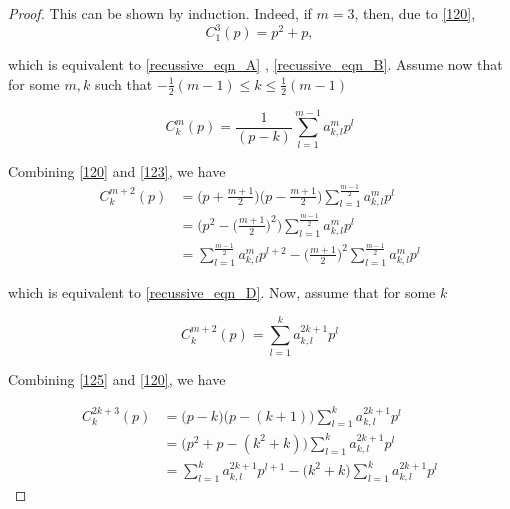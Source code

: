 \documentclass[../document.tex]{subfiles}
\begin{document}
\begin{appendices}
\begin{proof}
			This can be shown by induction. Indeed, if
			$m = 3$, then, due to \eqref{120},
			\begin{equation} \label{122}
				C_1^3(p) = p^2 +p,
			\end{equation}
			
			which is equivalent to \eqref{recussive_eqn_A} , \eqref{recussive_eqn_B}. Assume now that for some $m,k$ such that $	-\frac{1}{2}(m-1) \leq k \leq \frac{1}{2}(m-1) $
			
			
			\begin{equation}  \label{123}
				C_k^m(p) = \frac{1}{(p-k)} \sum_{l=1 }^{m-1} a_{k,l}^{m}p^l
			\end{equation}
			
			Combining \eqref{120} and \eqref{123}, we have
			\begin{equation} \label{124}
				\begin{split}
					C_k^{m+2}(p) &= \Big(p +\frac{m+1}{2}\Big) \Big(p -\frac{m+1}{2}\Big) 
					\sum_{l=1}^{\frac{m-1}{2}} a_{k,l}^{m}p^l
					\\
					&= \Bigg(p^2 -\Big( \frac{m+1}{2}\Big)^2\Bigg) 
					\sum_{l=1}^{\frac{m-1}{2}} a_{k,l}^{m}p^l
					\\
					&= \sum_{l=1}^{\frac{m-1}{2}} a_{k,l}^{m} p^{l+2}  - \Big( \frac{m+1}{2}\Big)^2 
					\sum_{l=1}^{\frac{m-1}{2}} a_{k,l}^{m} p^{l}
				\end{split}
			\end{equation}
			
			which is equivalent to \eqref{recussive_eqn_D}. Now, assume that for some $k$
			
			\begin{equation} \label{125}
				C_k^{m+2}(p) = 	\sum_{l=1}^{k} a_{k,l}^{2k+1}p^l
			\end{equation}
			
			Combining \eqref{125} and \eqref{120}, we have
			
			\begin{equation}
				\begin{split}
					C_k^{2k+3}(p) &= \big(p-k\big)\big(p-(k+1)\big) \sum_{l=1}^{k} a_{k,l}^{2k+1} p^l
					\\
					&= \big(p^2 +p -(k^2+k) \big) \sum_{l=1}^{k} a_{k,l}^{2k+1} p^l
					\\
					&= \sum_{l=1}^{k} a_{k,l}^{2k+1} p^{l+1} 
					- \big(k^2+k\big)\sum_{l=1}^{k}  a_{k,l}^{2k+1}p^l
				\end{split}
			\end{equation}
			

\end{proof}
\end{appendices}
\end{document}
